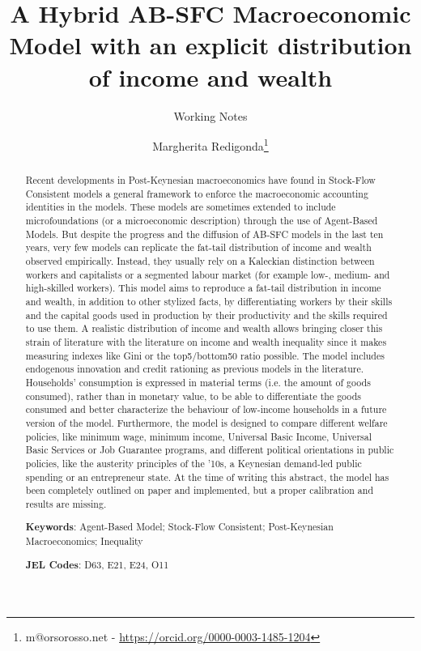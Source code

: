 \documentclass[a4paper, headings=standardclasses]{scrartcl}
\title{A Hybrid AB-SFC Macroeconomic Model with an explicit distribution of income and wealth \let\thefootnote\relax\footnotetext{
	This version is intended to be submitted as a working paper to the 2024 EAEPE Conference.

	An updated version of this paper and all the source code and the instructions required to replicate the paper will be available at \url{https://github.com/TnTo/FE/}
  }}
\subtitle{Working Notes}
\author{Margherita Redigonda\thanks{m@orsorosso.net - \url{https://orcid.org/0000-0003-1485-1204}}}
\begin{document}
\maketitle

\begin{abstract}
    Recent developments in Post-Keynesian macroeconomics have found in Stock-Flow Consistent models a general framework to enforce the macroeconomic accounting identities in the models.
    These models are sometimes extended to include microfoundations (or a microeconomic description) through the use of Agent-Based Models.
    But despite the progress and the diffusion of AB-SFC models in the last ten years, very few models can replicate the fat-tail distribution of income and wealth observed empirically.
    Instead, they usually rely on a Kaleckian distinction between workers and capitalists or a segmented labour market (for example low-, medium- and high-skilled workers).
    This model aims to reproduce a fat-tail distribution in income and wealth, in addition to other stylized facts, by differentiating workers by their skills and the capital goods used in production by their productivity and the skills required to use them.
    A realistic distribution of income and wealth allows bringing closer this strain of literature with the literature on income and wealth inequality since it makes measuring indexes like Gini or the top5/bottom50 ratio possible.
    The model includes endogenous innovation and credit rationing as previous models in the literature.
    Households' consumption is expressed in material terms (i.e. the amount of goods consumed), rather than in monetary value, to be able to differentiate the goods consumed and better characterize the behaviour of low-income households in a future version of the model.%
    Furthermore, the model is designed to compare different welfare policies, like minimum wage, minimum income, Universal Basic Income, Universal Basic Services or Job Guarantee programs, and different political orientations in public policies, like the austerity principles of the '10s, a Keynesian demand-led public spending or an entrepreneur state.
    At the time of writing this abstract, the model has been completely outlined on paper and implemented, but a proper calibration and results are missing.

    \textbf{Keywords}: Agent-Based Model; Stock-Flow Consistent; Post-Keynesian Macroeconomics; Inequality

    \textbf{JEL Codes}: D63, E21, E24, O11
\end{abstract}
\end{document}
